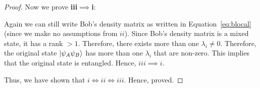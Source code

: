 \begin{solution}[label=ques:5]
\begin{proof}
    Now we prove \textbf{iii$\implies$i}:\par
    Again we can still write Bob's density matrix as written in Equation~\ref{eq:blocal} (since we make no assumptions from $ii$). Since Bob's density matrix is a mixed state, it has a rank $> 1$. Therefore, there exists more than one $\lambda_i \neq 0$. Therefore, the original state $\ket{\psi_A\psi_B}$ has more than one $\lambda_i$ that are non-zero. This implies that the original state is entangled. Hence, $iii\implies i$.\par\bigskip

    Thus, we have shown that $i\iff ii\iff iii$. Hence, proved.
  \end{proof}
\end{solution}
